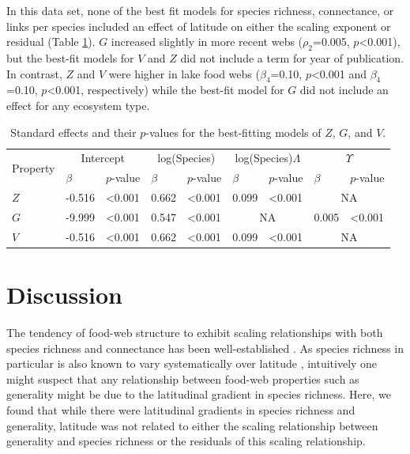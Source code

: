 \documentclass[12pt]{article}
\begin{document}
In this data set, none of the best fit models for species richness, connectance, or links per species included an 
effect of latitude on either the scaling exponent or residual (Table \ref{Bestfits}). 
$G$ increased slightly in more recent webs ($\rho_{2}$=0.005, $p$\textless0.001), but the best-fit models for $V$ and $Z$ did not include a term for year of publication. 
In contrast, $Z$ and $V$ were higher in lake food webs ($\beta_{4}$=0.10, $p$\textless0.001 and $\beta_{4}$=0.10, $p$\textless0.001, respectively) while the best-fit model for $G$ did not include an effect for any ecosystem type.

\begin{table}[!h]

\caption{Standard effects and their $p$-values for the best-fitting models of $Z$, $G$, and $V$.}
\label{Bestfits}
\begin{tabular}{l | l l | l l | l l | l l }
\multirow{2}{*}{Property} & \multicolumn{2}{c}{Intercept} & \multicolumn{2}{c}{log(Species)} & \multicolumn{2}{c}{log(Species)$\Lambda$} & \multicolumn{2}{c}{$\Upsilon$} \\
& $\beta$ & $p$-value &  $\beta$ & $p$-value &  $\beta$ & $p$-value &  $\beta$ & $p$-value  \\
\hline
$Z$ & -0.516 & \textless0.001 & 0.662 & \textless0.001 & 0.099 & \textless0.001 & \multicolumn{2}{c}{NA} \\
$G$ & -9.999 & \textless0.001 & 0.547 & \textless0.001 & \multicolumn{2}{c|}{NA} & 0.005 & \textless0.001 \\
$V$ & -0.516 & \textless0.001 & 0.662 & \textless0.001 & 0.099 & \textless0.001 & \multicolumn{2}{c}{NA} \\
\end{tabular}
\end{table}


\section*{Discussion}

The tendency of food-web structure to exhibit scaling relationships with both
species richness and connectance has been  well-established \citep{}. As
species richness in particular is also known to vary systematically over
latitude \citep{}, intuitively one might suspect that any relationship
between food-web properties such as generality might be due to the latitudinal
gradient in species richness. Here, we found that while there were latitudinal
gradients in species richness and generality, latitude was not related to
either the scaling relationship between generality and species richness or the
residuals of this scaling relationship.
\end{document}
